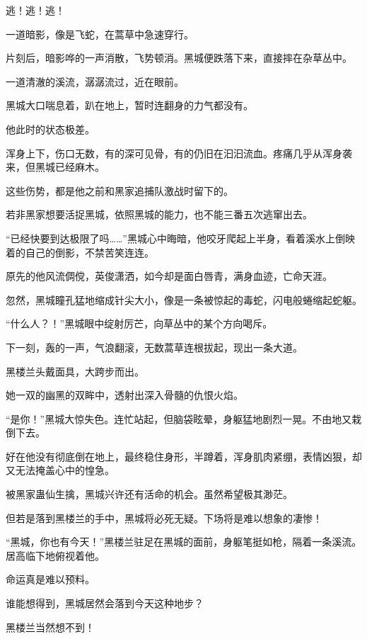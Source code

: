 
\begin{this_body}



逃！逃！逃！

一道暗影，像是飞蛇，在蒿草中急速穿行。

片刻后，暗影哗的一声消散，飞势顿消。黑城便跌落下来，直接摔在杂草丛中。

一道清澈的溪流，潺潺流过，近在眼前。

黑城大口喘息着，趴在地上，暂时连翻身的力气都没有。

他此时的状态极差。

浑身上下，伤口无数，有的深可见骨，有的仍旧在汩汩流血。疼痛几乎从浑身袭来，但黑城已经麻木。

这些伤势，都是他之前和黑家追捕队激战时留下的。

若非黑家想要活捉黑城，依照黑城的能力，也不能三番五次逃窜出去。

“已经快要到达极限了吗……”黑城心中晦暗，他咬牙爬起上半身，看着溪水上倒映着的自己的倒影，不禁苦笑连连。

原先的他风流倜傥，英俊潇洒，如今却是面白唇青，满身血迹，亡命天涯。

忽然，黑城瞳孔猛地缩成针尖大小，像是一条被惊起的毒蛇，闪电般蜷缩起蛇躯。

“什么人？！”黑城眼中绽射厉芒，向草丛中的某个方向喝斥。

下一刻，轰的一声，气浪翻滚，无数蒿草连根拔起，现出一条大道。

黑楼兰头戴面具，大跨步而出。

她一双的幽黑的双眸中，透射出深入骨髓的仇恨火焰。

“是你！”黑城大惊失色。连忙站起，但脑袋眩晕，身躯猛地剧烈一晃。不由地又栽倒下去。

好在他没有彻底倒在地上，最终稳住身形，半蹲着，浑身肌肉紧绷，表情凶狠，却又无法掩盖心中的惶急。

被黑家蛊仙生擒，黑城兴许还有活命的机会。虽然希望极其渺茫。

但若是落到黑楼兰的手中，黑城将必死无疑。下场将是难以想象的凄惨！

“黑城，你也有今天！”黑楼兰驻足在黑城的面前，身躯笔挺如枪，隔着一条溪流。居高临下地俯视着他。

命运真是难以预料。

谁能想得到，黑城居然会落到今天这种地步？

黑楼兰当然想不到！


\end{this_body}
